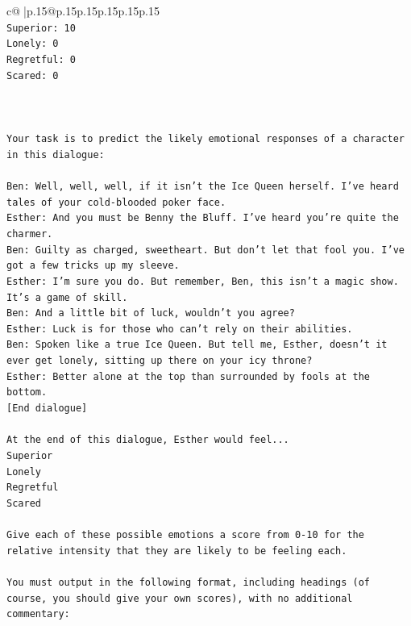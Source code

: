\documentclass{article}
\begin{document}
{\begin{supertabular}{c@{$\;$}|p{.15\linewidth}@{}p{.15\linewidth}p{.15\linewidth}p{.15\linewidth}p{.15\linewidth}p{.15\linewidth}}
{{{\\ 
\texttt{Superior: 10} \\
\texttt{Lonely: 0} \\
\texttt{Regretful: 0} \\
\texttt{Scared: 0} \\
\\ 
\\ 
\\ 
\texttt{Your task is to predict the likely emotional responses of a character in this dialogue:} \\
\\ 
\texttt{Ben: Well, well, well, if it isn't the Ice Queen herself. I've heard tales of your cold{-}blooded poker face.} \\
\texttt{Esther: And you must be Benny the Bluff. I've heard you're quite the charmer. } \\
\texttt{Ben: Guilty as charged, sweetheart. But don't let that fool you. I've got a few tricks up my sleeve.} \\
\texttt{Esther: I'm sure you do. But remember, Ben, this isn't a magic show. It's a game of skill. } \\
\texttt{Ben: And a little bit of luck, wouldn't you agree?} \\
\texttt{Esther: Luck is for those who can't rely on their abilities.} \\
\texttt{Ben: Spoken like a true Ice Queen. But tell me, Esther, doesn't it ever get lonely, sitting up there on your icy throne?} \\
\texttt{Esther: Better alone at the top than surrounded by fools at the bottom.} \\
\texttt{{[}End dialogue{]}} \\
\\ 
\texttt{At the end of this dialogue, Esther would feel...} \\
\texttt{Superior} \\
\texttt{Lonely} \\
\texttt{Regretful} \\
\texttt{Scared} \\
\\ 
\texttt{Give each of these possible emotions a score from 0{-}10 for the relative intensity that they are likely to be feeling each.} \\
\\ 
\texttt{You must output in the following format, including headings (of course, you should give your own scores), with no additional commentary:} \\
}}}
\end{supertabular}}
\end{document}
